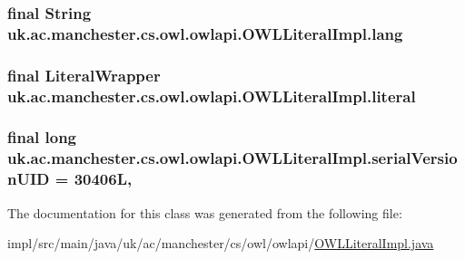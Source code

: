\hypertarget{classuk_1_1ac_1_1manchester_1_1cs_1_1owl_1_1owlapi_1_1_o_w_l_literal_impl_a3de0bc1d3e12ca115919cdc550bcdcc2}{
\subsubsection[{lang}]{\setlength{\rightskip}{0pt plus 5cm}final String uk.\-ac.\-manchester.\-cs.\-owl.\-owlapi.\-O\-W\-L\-Literal\-Impl.\-lang\hspace{0.3cm}{\ttfamily [private]}}}\label{classuk_1_1ac_1_1manchester_1_1cs_1_1owl_1_1owlapi_1_1_o_w_l_literal_impl_a3de0bc1d3e12ca115919cdc550bcdcc2}
\hypertarget{classuk_1_1ac_1_1manchester_1_1cs_1_1owl_1_1owlapi_1_1_o_w_l_literal_impl_aadce851c6acf671e9c1f7595c74cb5f3}{
\subsubsection[{literal}]{\setlength{\rightskip}{0pt plus 5cm}final Literal\-Wrapper uk.\-ac.\-manchester.\-cs.\-owl.\-owlapi.\-O\-W\-L\-Literal\-Impl.\-literal\hspace{0.3cm}{\ttfamily [private]}}}\label{classuk_1_1ac_1_1manchester_1_1cs_1_1owl_1_1owlapi_1_1_o_w_l_literal_impl_aadce851c6acf671e9c1f7595c74cb5f3}
\hypertarget{classuk_1_1ac_1_1manchester_1_1cs_1_1owl_1_1owlapi_1_1_o_w_l_literal_impl_a84ae023641151feb967ec78b9dbdfe13}{
\subsubsection[{serial\-Version\-U\-I\-D}]{\setlength{\rightskip}{0pt plus 5cm}final long uk.\-ac.\-manchester.\-cs.\-owl.\-owlapi.\-O\-W\-L\-Literal\-Impl.\-serial\-Version\-U\-I\-D = 30406\-L\hspace{0.3cm}{\ttfamily [static]}, {\ttfamily [private]}}}\label{classuk_1_1ac_1_1manchester_1_1cs_1_1owl_1_1owlapi_1_1_o_w_l_literal_impl_a84ae023641151feb967ec78b9dbdfe13}


The documentation for this class was generated from the following file\-:\begin{DoxyCompactItemize}
\item 
impl/src/main/java/uk/ac/manchester/cs/owl/owlapi/\hyperlink{_o_w_l_literal_impl_8java}{O\-W\-L\-Literal\-Impl.\-java}\end{DoxyCompactItemize}
